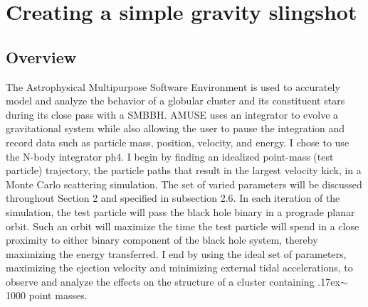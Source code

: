 \documentclass{aastex62}
\begin{document}
\section{Creating a simple gravity slingshot}
\subsection{Overview}
The Astrophysical Multipurpose Software Environment \citep{zwart18} is used to accurately model and analyze the behavior of a globular cluster and its constituent stars during its close pass with a SMBBH. AMUSE uses an integrator to evolve a gravitational system while also allowing the user to pause the integration and record data such as particle mass, position, velocity, and energy. I chose to use the N-body integrator ph4. I begin by finding an idealized point-mass (test particle) trajectory, the particle paths that result in the largest velocity kick, in a Monte Carlo scattering simulation. The set of varied parameters will be discussed throughout Section 2 and specified in subsection 2.6. In each iteration of the simulation, the test particle will pass the black hole binary in a prograde planar orbit. Such an orbit will maximize the time the test particle will spend in a close proximity to either binary component of the black hole system, thereby maximizing the energy transferred. I end by using the ideal set of parameters, maximizing the ejection velocity and minimizing external tidal accelerations, to observe and analyze the effects on the structure of a cluster containing {\raise.17ex\hbox{$\scriptstyle\mathtt{\sim}$}}1000 point masses. 
\end{document}
